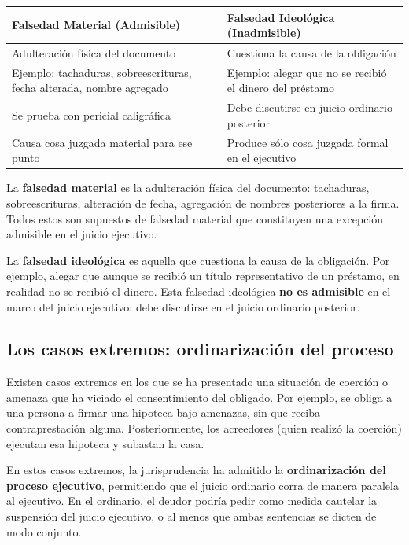\documentclass[12pt,oneside]{book}
\begin{document}
\begin{table}[H]
\centering
\begin{tabularx}{\textwidth}{Xp{5cm}}
\toprule
\textbf{Falsedad Material (Admisible)} & \textbf{Falsedad Ideológica (Inadmisible)} \\
\midrule
Adulteración física del documento & Cuestiona la causa de la obligación \\
\midrule
Ejemplo: tachaduras, sobreescrituras, fecha alterada, nombre agregado & Ejemplo: alegar que no se recibió el dinero del préstamo \\
\midrule
Se prueba con pericial caligráfica & Debe discutirse en juicio ordinario posterior \\
\midrule
Causa cosa juzgada material para ese punto & Produce sólo cosa juzgada formal en el ejecutivo \\
\bottomrule
\end{tabularx}
\end{table}

La \textbf{falsedad material} es la adulteración física del documento: tachaduras, sobreescrituras, alteración de fecha, agregación de nombres posteriores a la firma. Todos estos son supuestos de falsedad material que constituyen una excepción admisible en el juicio ejecutivo.

La \textbf{falsedad ideológica} es aquella que cuestiona la causa de la obligación. Por ejemplo, alegar que aunque se recibió un título representativo de un préstamo, en realidad no se recibió el dinero. Esta falsedad ideológica \textbf{no es admisible} en el marco del juicio ejecutivo: debe discutirse en el juicio ordinario posterior.

\subsection{Los casos extremos: ordinarización del proceso}

Existen casos extremos en los que se ha presentado una situación de coerción o amenaza que ha viciado el consentimiento del obligado. Por ejemplo, se obliga a una persona a firmar una hipoteca bajo amenazas, sin que reciba contraprestación alguna. Posteriormente, los acreedores (quien realizó la coerción) ejecutan esa hipoteca y subastan la casa.

En estos casos extremos, la jurisprudencia ha admitido la \textbf{ordinarización del proceso ejecutivo}, permitiendo que el juicio ordinario corra de manera paralela al ejecutivo. En el ordinario, el deudor podría pedir como medida cautelar la suspensión del juicio ejecutivo, o al menos que ambas sentencias se dicten de modo conjunto.
\end{document}
